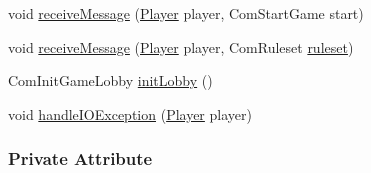 \begin{DoxyCompactItemize}
\item 
void \hyperlink{a00072_a2b14aeb687a64757909eee2500e3ff82}{receive\-Message} (\hyperlink{a00076}{Player} player, Com\-Start\-Game start)
\item 
void \hyperlink{a00072_a0059ea63f742881760c30dbbc05e3ca4}{receive\-Message} (\hyperlink{a00076}{Player} player, Com\-Ruleset \hyperlink{a00072_a67a78e259859051426c3ad7f1a67f143}{ruleset})
\item 
Com\-Init\-Game\-Lobby \hyperlink{a00072_a3dd6393220c1b663119a5badf4d3de1a}{init\-Lobby} ()
\item 
void \hyperlink{a00072_af3ddb51daa156429385870eb04bd456e}{handle\-I\-O\-Exception} (\hyperlink{a00076}{Player} player)
\end{DoxyCompactItemize}
\subsubsection*{Private Attribute}

